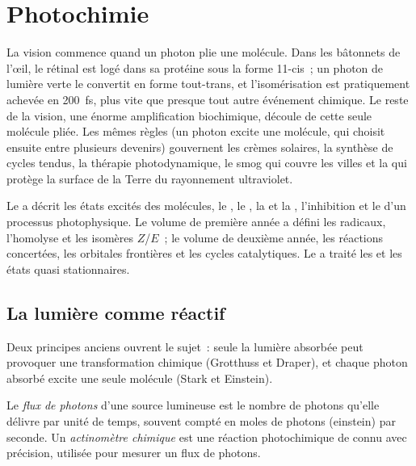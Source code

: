 \chapter{Photochimie}\label{ch:b3:photochemistry}

La vision commence quand un photon plie une molécule. Dans les bâtonnets
de l'œil, le rétinal est logé dans sa protéine sous la forme 11-cis~; un
photon de lumière verte le convertit en forme tout-trans, et
l'isomérisation est pratiquement achevée en
\qty{200}{fs}, plus vite que presque tout autre événement chimique. Le
reste de la vision, une énorme amplification biochimique, découle de
cette seule molécule pliée. Les mêmes règles (un photon excite une
molécule, qui choisit ensuite entre plusieurs devenirs) gouvernent les
crèmes solaires, la synthèse de cycles tendus, la thérapie
photodynamique, le smog qui couvre les villes et la  qui
protège la surface de la Terre du rayonnement ultraviolet.

\begin{recall}
Le  a décrit les états excités des
molécules, le , le , la
 et la , l'inhibition et le  d'un processus photophysique. Le volume de première année a
défini les radicaux, l'homolyse et les isomères $Z$/$E$~; le volume de
deuxième année, les réactions concertées, les orbitales frontières et
les cycles catalytiques. Le
 a traité les  et les
états quasi stationnaires.
\end{recall}

\section{La lumière comme réactif}

Deux principes anciens ouvrent le sujet~: seule la lumière absorbée peut
provoquer une transformation chimique (Grotthuss et Draper), et chaque
photon absorbé excite une seule molécule (Stark et Einstein).

\begin{definition}\label{def:b3:photochemistry:photon-flux}
Le \emph{flux de photons} d'une source lumineuse
est le nombre de photons qu'elle délivre par unité de temps, souvent
compté en moles de photons (einstein) par seconde. Un \emph{actinomètre
chimique} est une
réaction photochimique de  connu avec précision,
utilisée pour mesurer un flux de photons.
\end{definition}

